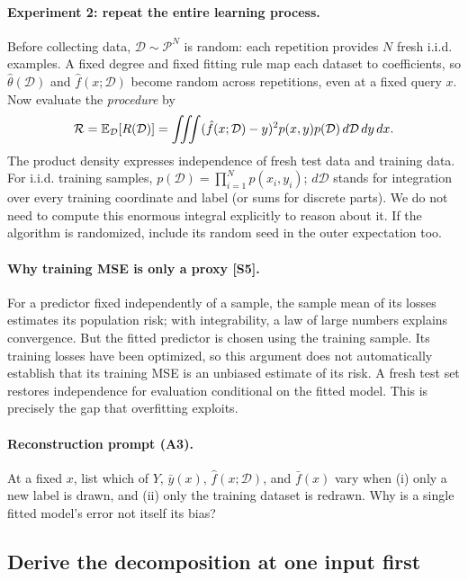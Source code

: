 \paragraph{Experiment 2: repeat the entire learning process.} Before collecting data, $\mathcal D\sim\mathcal P^N$ is random: each repetition provides $N$ fresh i.i.d. examples. A fixed degree and fixed fitting rule map each dataset to coefficients, so $\hat\theta(\mathcal D)$ and $\hat f(x;\mathcal D)$ become random across repetitions, even at a fixed query $x$. Now evaluate the \emph{procedure} by
\begin{equation}
\mathcal R=\mathbb{E}_{\mathcal D}[R(\mathcal D)]
=\iiint(\hat f(x;\mathcal D)-y)^2p(x,y)p(\mathcal D)\,d\mathcal D\,dy\,dx.
\end{equation}
The product density expresses independence of fresh test data and training data. For i.i.d. training samples, $p(\mathcal D)=\prod_{i=1}^N p(x_i,y_i)$; $d\mathcal D$ stands for integration over every training coordinate and label (or sums for discrete parts). We do not need to compute this enormous integral explicitly to reason about it. If the algorithm is randomized, include its random seed in the outer expectation too.

\paragraph{Why training MSE is only a proxy [S5].} For a predictor fixed independently of a sample, the sample mean of its losses estimates its population risk; with integrability, a law of large numbers explains convergence. But the fitted predictor is chosen using the training sample. Its training losses have been optimized, so this argument does not automatically establish that its training MSE is an unbiased estimate of its risk. A fresh test set restores independence for evaluation conditional on the fitted model. This is precisely the gap that overfitting exploits.

\paragraph{Reconstruction prompt (A3).} At a fixed $x$, list which of $Y$, $\bar y(x)$, $\hat f(x;\mathcal D)$, and $\bar f(x)$ vary when (i) only a new label is drawn, and (ii) only the training dataset is redrawn. Why is a single fitted model's error not itself its bias?

\subsection{Derive the decomposition at one input first}
\label{sec:reg:proof}
